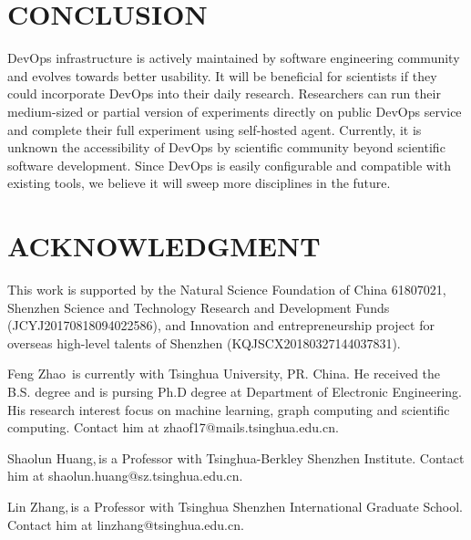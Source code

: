 \documentclass{IEEEcsmag}
\begin{document}
\section{CONCLUSION}
DevOps infrastructure is actively maintained by software engineering community and evolves towards better usability. It will be beneficial for scientists if they could incorporate DevOps into their daily research. Researchers can run their medium-sized or partial version of experiments directly on public DevOps service and complete their full experiment using self-hosted agent. Currently, it is unknown the accessibility of DevOps by scientific community beyond scientific software development. Since DevOps is easily configurable and compatible with existing tools, we believe it will sweep more disciplines in the future.

\section{ACKNOWLEDGMENT}

This work is supported by the Natural Science Foundation of China 61807021, Shenzhen Science and Technology Research and Development Funds (JCYJ20170818094022586), and Innovation and entrepreneurship project for overseas high-level talents of Shenzhen (KQJSCX20180327144037831).







\begin{IEEEbiography}{Feng Zhao}{\,} is
currently with Tsinghua University, PR. China. He received the B.S. degree and is pursing Ph.D degree at Department of Electronic Engineering. His research interest focus on machine learning, graph computing and scientific computing. Contact him at zhaof17@mails.tsinghua.edu.cn.
\end{IEEEbiography}

\begin{IEEEbiography}{Shaolun Huang,}{\,}is a Professor with Tsinghua-Berkley Shenzhen Institute. Contact him at shaolun.huang@sz.tsinghua.edu.cn.
\end{IEEEbiography}

\begin{IEEEbiography}{Lin Zhang,}{\,}is a Professor with Tsinghua Shenzhen International Graduate School. Contact him at linzhang@tsinghua.edu.cn.
\end{IEEEbiography}
\end{document}
